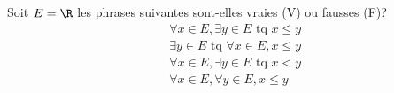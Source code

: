 Soit $E= \R$ les phrases suivantes sont-elles vraies (V) ou fausses (F)?
\begin{align*}
  &\forall x \in E,  \exists y \in E \text{ tq } x\leq y \\
  &\exists y \in E \text{ tq } \forall x \in E, x\leq y  \\
  &\forall x \in E,  \exists y \in E \text{ tq } x < y \\
  &\forall x \in E,  \forall y \in E,  x\leq y \\
\end{align*}
